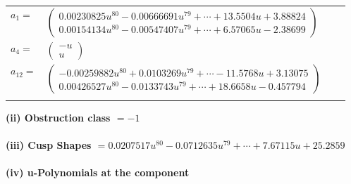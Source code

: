\documentclass[1p]{elsarticle_modified}
\theoremstyle{definition}
\begin{document}
\begin{tabular}{m{7pt} m{180pt} m{7pt} m{180pt} }
\flushright $a_{1}=$&$\begin{pmatrix}0.00230825 u^{80}-0.00666691 u^{79}+\cdots+13.5504 u+3.88824\\0.00154134 u^{80}-0.00547407 u^{79}+\cdots+6.57065 u-2.38699\end{pmatrix}$ \\
\flushright $a_{4}=$&$\begin{pmatrix}- u\\u\end{pmatrix}$ \\
\flushright $a_{12}=$&$\begin{pmatrix}-0.00259882 u^{80}+0.0103269 u^{79}+\cdots-11.5768 u+3.13075\\0.00426527 u^{80}-0.0133743 u^{79}+\cdots+18.6658 u-0.457794\end{pmatrix}$\\&\end{tabular}
\flushleft \textbf{(ii) Obstruction class $= -1$}\\~\\
\flushleft \textbf{(iii) Cusp Shapes $= 0.0207517 u^{80}-0.0712635 u^{79}+\cdots+7.67115 u+25.2859$}\\~\\
\newpage\renewcommand{\arraystretch}{1}
\flushleft \textbf{(iv) u-Polynomials at the component}\newline \\
\end{document}
